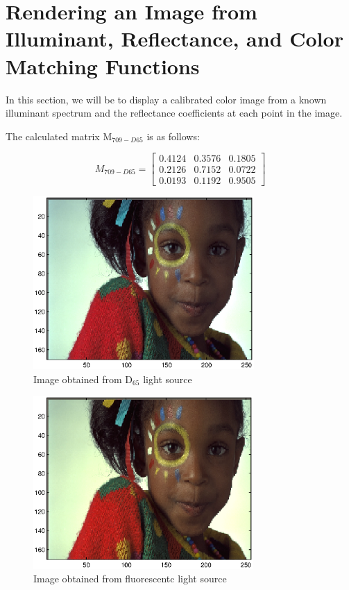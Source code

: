\documentclass[paper=a4, fontsize=11pt]{scrartcl} %
\numberwithin{equation}{section} %
\numberwithin{figure}{section} %
\numberwithin{table}{section} %
\begin{document}
\section{Rendering an Image from Illuminant, Reflectance,
	and Color Matching Functions
}
In this section, we will be to display a calibrated color image from a known illuminant
spectrum and the reflectance coefficients at each point in the image.


\vspace{6pt} 


The calculated matrix M$_{709-D65}$ is as follows:


\[
M_{709-D65} = 
\begin{bmatrix}
0.4124    &0.3576    &0.1805 \\
0.2126    &0.7152    &0.0722 \\
0.0193    &0.1192    &0.9505
\end{bmatrix}
\]

\begin{figure}[H]
	
	\centering
	\includegraphics[height = 2.6in]{5.eps}
	\caption{Image obtained from D$_{65}$ light source}
	
	
	
\end{figure}

\begin{figure}[H]

\centering
\includegraphics[height = 2.6in]{7.eps}
\caption{Image obtained from fluorescentc light source}

\end{figure}
\end{document}
